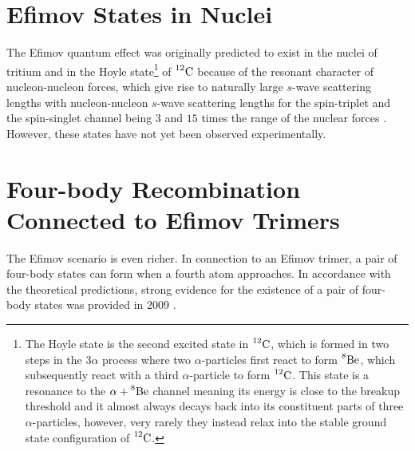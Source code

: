 \section{Efimov States in Nuclei }
The Efimov quantum effect was originally predicted to exist in the nuclei of tritium and in the Hoyle state\footnote{The Hoyle state is the second excited state in $\prescript{12}{}{\mathrm{C}}$, which is formed in two steps in the $3\alpha$ process where two $\alpha$-particles first react to form $\prescript{8}{}{\mathrm{Be}}$, which subsequently react with a third $\alpha$-particle to form $\prescript{12}{}{\mathrm{C}}$. This state is a resonance to the $\alpha + \prescript{8}{}{\mathrm{Be}}$ channel meaning its energy is close to the breakup threshold and it almost always decays back into its constituent parts of three $\alpha$-particles, however, very rarely they instead relax into the stable ground state configuration of $\prescript{12}{}{\mathrm{C}}$.} of $\prescript{12}{}{\mathrm{C}}$ because of the resonant character of nucleon-nucleon forces, which give rise to naturally large $s$-wave scattering lengths with nucleon-nucleon $s$-wave scattering lengths for the spin-triplet and the spin-singlet channel being $3$ and $15$ times the range of the nuclear forces \cite{Efimov:1970zz,Efimov:1971zz}.  However, these states have not yet been observed experimentally. 

\section{Four-body Recombination Connected to Efimov Trimers} 
The Efimov scenario is even richer. In connection to an Efimov trimer, a pair of four-body states can form when a fourth atom approaches. In accordance with the theoretical predictions, strong evidence for the existence of a pair of four-body states was provided in 2009 \cite{Grimm:2009}.
